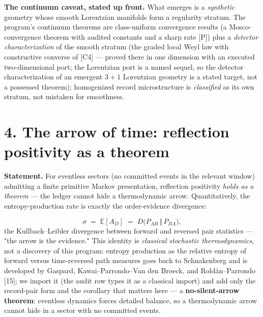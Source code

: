 \documentclass[11pt]{article}
\begin{document}
\textbf{The continuum caveat, stated up front.}  What emerges is a \emph{synthetic} geometry whose smooth Lorentzian manifolds form a regularity stratum.  The program's continuum theorems are class-uniform convergence results (a Mosco-convergence theorem with audited constants and a sharp rate [P]) plus a \emph{detector characterization} of the smooth stratum (the graded local Weyl law with constructive converse of [C4] — proved there in one dimension with an executed two-dimensional port; the Lorentzian port is a named sequel, so the detector characterization of an emergent $3{+}1$ Lorentzian geometry is a stated target, not a possessed theorem); homogenized record microstructure is \emph{classified} as its own stratum, not mistaken for smoothness.

\section*{4. The arrow of time: reflection positivity as a theorem}
\textbf{Statement.}  For eventless sectors (no committed events in the relevant window) admitting a finite primitive Markov presentation, reflection positivity \emph{holds as a theorem} — the ledger cannot hide a thermodynamic arrow.  Quantitatively, the entropy-production rate is exactly the order-evidence divergence:

\[
\sigma \;=\; \mathbb E[A_D] \;=\; D\bigl(P_{AB}\,\Vert\,P_{BA}\bigr),
\]
the Kullback–Leibler divergence between forward and reversed pair statistics — "the arrow is the evidence."  This identity is \emph{classical stochastic thermodynamics}, not a discovery of this program: entropy production as the relative entropy of forward versus time-reversed path measures goes back to Schnakenberg and is developed by Gaspard, Kawai–Parrondo–Van den Broeck, and Roldán–Parrondo [15]; we import it (the audit row types it as a classical import) and add only the record-pair form and the corollary that matters here — a \textbf{no-silent-arrow theorem}: eventless dynamics forces detailed balance, so a thermodynamic arrow cannot hide in a sector with no committed events.
\end{document}
